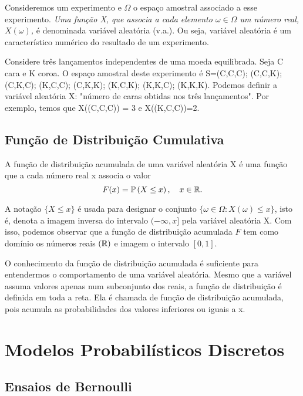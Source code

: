 \documentclass[10pt,a4paper]{article}
\begin{document}
\begin{df}
	Consideremos um experimento e $ \Omega $ o espaço amostral associado a esse experimento. \emph{ Uma função X, que associa a cada elemento $ \omega \in \Omega $ um número real, $ X(\omega) $,} é denominada variável aleatória (v.a.). Ou seja, variável aleatória é um característico numérico do resultado de um experimento.
\end{df}

\begin{eg}
	Considere três lançamentos independentes de uma moeda equilibrada. Seja C cara e K coroa. O espaço amostral deste experimento é S={(C,C,C); (C,C,K); (C,K,C); (K,C,C); (C,K,K); (K,C,K); (K,K,C); (K,K,K)}. Podemos definir a variável aleatória X: "número de caras obtidas nos três lançamentos". Por exemplo, temos que X((C,C,C)) = 3 e X((K,C,C))=2.
\end{eg}

\subsection{Função de Distribuição Cumulativa}

\begin{df}
A função de distribuição acumulada de uma variável aleatória X é uma função que a cada número real x associa o valor 
\[F(x)=\mathbb{P}\left(X\leq x\right), \quad x \in \Bbb{R}.\] 	

A notação $ \{X \leq x\} $ é usada para designar o conjunto $\lbrace \omega \in \Omega :  X(\omega) \leq x\} $, isto é, denota a imagem inversa do intervalo $ (-\infty,x] $ pela variável aleatória X. Com isso, podemos observar que a função de distribuição acumulada $ F $ tem como domínio os números reais $ (\Bbb{R}) $ e imagem o intervalo $ [0,1] $.

O conhecimento da função de distribuição acumulada é suficiente para entendermos o comportamento de uma variável aleatória. Mesmo que a variável assuma valores apenas num subconjunto dos reais, a função de distribuição é definida em toda a reta. Ela é chamada de função de distribuição acumulada, pois acumula as probabilidades dos valores inferiores ou iguais a x.
\end{df}



\section{Modelos Probabilísticos Discretos}
\subsection{Ensaios de Bernoulli}
\end{document}
